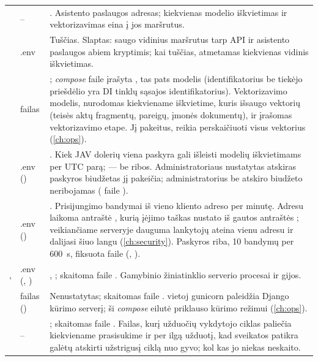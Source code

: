 \begin{xltabular}{\textwidth}{@{}L{40mm}L{21mm}Y@{}}
 & -- & . Asistento paslaugos adresas; kiekvienas modelio iškvietimas ir vektorizavimas eina į jos  maršrutus. \\
 & .env & Tuščias. Slaptas: saugo vidinius maršrutus tarp API ir asistento paslaugos abiem kryptimis; kai tuščias, atmetamas kiekvienas vidinis iškvietimas. \\
 & failas & ; \textit{compose} faile įrašyta , tas pats modelis (identifikatorius be tiekėjo priešdėlio yra DI tinklų sąsajos identifikatorius). Vektorizavimo modelis, nurodomas kiekviename iškvietime, kuris išsaugo vektorių (teisės aktų fragmentų, pareigų, įmonės dokumentų), ir įrašomas vektorizavimo etape. Jį pakeitus, reikia perskaičiuoti visus vektorius (\cref{ch:ops}). \\
 & .env () & . Kiek JAV dolerių viena paskyra gali išleisti modelių iškvietimams per UTC parą;  --- be ribos. Administratoriaus nustatytas atskiras paskyros biudžetas jį pakeičia; administratorius be atskiro biudžeto neribojamas ( faile ). \\
 & .env () & . Prisijungimo bandymai iš vieno kliento adreso per minutę. Adresu laikoma antraštė , kurią įėjimo taškas nustato iš gautos antraštės ; veikiančiame serveryje dauguma lankytojų ateina vienu adresu ir dalijasi šiuo langu (\cref{ch:security}). Paskyros riba, 10 bandymų per 600~s, fiksuota faile  (, ). \\
,  & .env (, ) & , ; skaitoma faile . Gamybinio žiniatinklio serverio procesai ir gijos. \\
 & failas () & Nenustatytas; skaitomas faile .  vietoj gunicorn paleidžia Django kūrimo serverį; ši \textit{compose} eilutė priklauso kūrimo režimui (\cref{ch:ops}). \\
 & -- & ; skaitomas faile . Failas, kurį užduočių vykdytojo ciklas paliečia kiekviename prasisukime ir per ilgą užduotį, kad sveikatos patikra galėtų atskirti užstrigusį ciklą nuo gyvo; kol kas jo niekas neskaito. \\

\end{xltabular}
